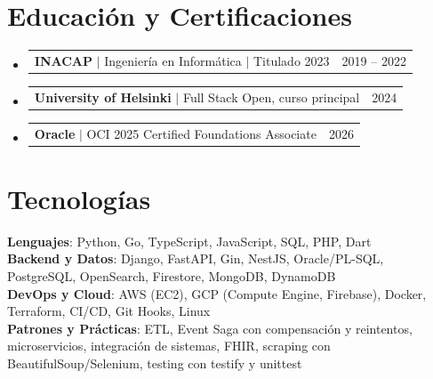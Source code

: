 \documentclass[letterpaper,11pt]{article}
\makeatletter
\newcommand{\resumeProjectHeading}[2]{%
        \item
                \begin{tabular*}{0.97\textwidth}{l@{\extracolsep{\fill}}r}
                        \small#1 & #2 \\
                \end{tabular*}\vspace{-7pt}%
        }
\newcommand{\resumeSubHeadingListStart}{%
                \begin{itemize}[leftmargin=0.15in, label={}]%
                }
\newcommand{\resumeSubHeadingListEnd}{%
        \end{itemize}\vspace{-3pt}%
}
\makeatother
\begin{document}

\section{Educación y Certificaciones}

\resumeSubHeadingListStart

\resumeProjectHeading
{\textbf{INACAP} $|$ Ingeniería en Informática $|$ Titulado 2023}
{2019 -- 2022}

\resumeProjectHeading
{\textbf{University of Helsinki} $|$ Full Stack Open, curso principal}
{2024}

\resumeProjectHeading
{\textbf{Oracle} $|$ OCI 2025 Certified Foundations Associate}
{2026}

\resumeSubHeadingListEnd



\section{Tecnologías}

\small{
        \textbf{Lenguajes}: Python, Go, TypeScript, JavaScript, SQL, PHP, Dart \\
        \textbf{Backend y Datos}: Django, FastAPI, Gin, NestJS, Oracle/PL-SQL,
        PostgreSQL, OpenSearch, Firestore, MongoDB, DynamoDB \\
        \textbf{DevOps y Cloud}: AWS (EC2), GCP (Compute Engine, Firebase), Docker,
        Terraform, CI/CD, Git Hooks, Linux \\
        \textbf{Patrones y Prácticas}: ETL, Event Saga con compensación y
        reintentos, microservicios, integración de sistemas, FHIR, scraping con
        BeautifulSoup/Selenium, testing con testify y unittest
}
\end{document}
